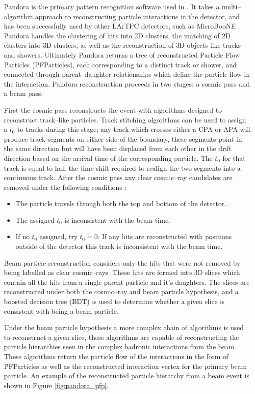 Pandora \cite{Marshall2015} is the primary pattern recognition software used in
\protodune{}. It takes a multi--algorithm approach to reconstructing particle
interactions in the detector, and has been successfully used by other LArTPC
detectors, such as MicroBooNE \cite{Acciarri:2017hat}. Pandora handles the 
clustering of hits into 2D clusters, the matching of 2D clusters into 3D
clusters, as well as the reconstruction of 3D objects like tracks and 
showers. Ultimately Pandora returns a tree of reconstructed Particle Flow
Particles (PFParticles), each corresponding to a distinct track or shower, and 
connected through parent--daughter relationships which define the particle flow 
in the interaction. Pandora reconstruction proceeds in two stages: a cosmic 
pass and a beam pass. 

First the cosmic pass reconstructs the event with algorithms designed to 
reconstruct track--like particles. Track stitching algorithms can be used to
assign a $t_0$ to tracks during this stage; any track which crosses either a CPA
or APA will produce track segments on either side of the boundary, these
segments point in the same direction but will have been displaced from each 
other in the drift direction based on the arrival time of the corresponding 
particle. The $t_0$ for that track is equal to half the time shift required to 
realign the two segments into a continuous track. After the cosmic pass any 
clear cosmic--ray candidates are removed under the following conditions 
\cite{protoduneperf}:
\begin{itemize}
	\item The particle travels through both the top and bottom of the detector.
	\item The assigned $t_0$ is inconsistent with the beam time.
	\item If no $t_0$ assigned, try $t_0 = 0$. If any hits are reconstructed 
		with positions outside of the detector this track is inconsistent with the 
		beam time.
\end{itemize}

Beam particle reconstruction considers only the hits that were not removed by 
being labelled as clear cosmic--rays. These hits are formed into 3D slices which
contain all the hits from a single parent particle and it's daughters. The
slices are reconstructed under both the cosmic--ray and beam particle
hypothesis, and a boosted decision tree (BDT) is used to determine whether a 
given slice is consistent with being a beam particle. 

Under the beam particle hypothesis a more complex chain of algorithms is used to
reconstruct a given slice, these algorithms are capable of reconstructing the
particle hierarchies seen in the complex hadronic interactions from the
\protodune{} beam. These algorithms return the particle flow of the interactions
in the form of PFParticles as well as the reconstructed interaction vertex for
the primary beam particle. An example of the reconstructed particle hierarchy
from a \protodune{} beam event is shown in Figure \ref{fig:pandora_pfp}.

